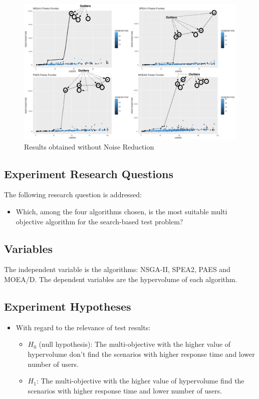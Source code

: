\documentclass[espaco=umemeio,chapter=TITLE,twoside,openright]{abnt}
\begin{document}
\begin{figure}[!h]
\centering
\includegraphics[width=1\textwidth]{./images/outliers.png}
\caption{Results obtained without Noise Reduction}
\label{fig:outliers}
\end{figure}


\subsection{Experiment Research Questions}

The following research question is addressed:
\begin{itemize}
\item Which, among the four algorithms chosen, is the most suitable multi objective algorithm for the search-based test problem?
\end{itemize}

\subsection{Variables}

The independent variable is the algorithms: NSGA-II, SPEA2, PAES and MOEA/D. The dependent variables are the hypervolume of each algorithm.

\subsection{Experiment Hypotheses}

\begin{itemize}
\item With regard to the relevance of test results:
\begin{itemize}
\item $H_{0}$ (null hypothesis): The multi-objective with the higher value of hypervolume don't find the scenarios with higher response time and lower number of users.
\item $H_{1}$: The multi-objective with  the higher value of hypervolume find the scenarios with higher response time and lower number of users.
\end{itemize}
\end{itemize}
\end{document}
